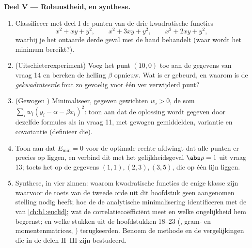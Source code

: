 \begin{problem}
\medskip
\noindent\textbf{Deel V --- Robuustheid, en synthese.}
\begin{enumerate}[resume]
  \item Classificeer met deel I de  punten van de drie
        kwadratische functies
        \[
        x^2 + xy + y^2, \qquad x^2 + 3xy + y^2, \qquad
        x^2 + 2xy + y^2 ,
        \]
        waarbij je het ontaarde derde geval met de hand behandelt
        (waar wordt het minimum bereikt?).
  \item (Uitschieterexperiment) Voeg het punt $(10, 0)$ toe aan de
        gegevens van vraag 14 en bereken de helling $\beta$
        opnieuw. Wat is er gebeurd, en waarom is de
        \emph{gekwadrateerde} fout zo gevoelig voor één ver
        verwijderd punt?
  \item (Gewogen ) Minimaliseer, gegeven
        gewichten $w_i > 0$, de som $\sum_i w_i(y_i - \alpha -
        \beta x_i)^2$: toon aan dat de oplossing wordt gegeven door
        dezelfde formules als in vraag 11, met gewogen
        gemiddelden, variantie en covariantie (definieer die).
  \item Toon aan dat $E_{\min} = 0$ voor de optimale rechte
        afdwingt dat alle punten er precies op liggen, en verbind
        dit met het gelijkheidsgeval $\abs\rho = 1$ uit vraag 13;
        toets het op de gegevens $(1,1), (2,3), (3,5)$, die op één
        lijn liggen.
  \item Synthese, in vier zinnen: waarom kwadratische functies de
        enige klasse zijn waarvoor de toets van de tweede orde uit
        dit hoofdstuk geen aangenomen stelling nodig heeft; hoe de
         de analytische minimalisering
        identificeren met de  van
        \cref{ch:b1:euclid}; wat de correlatiecoëfficiënt meet en
        welke ongelijkheid hem begrenst; en welke stukken uit de
        hoofdstukken 18--23 (, gram- en momentenmatrices,
        ) terugkeerden. Benoem de methode en de
        vergelijkingen die in de delen II--III zijn bestudeerd.
\end{enumerate}
\end{problem}

